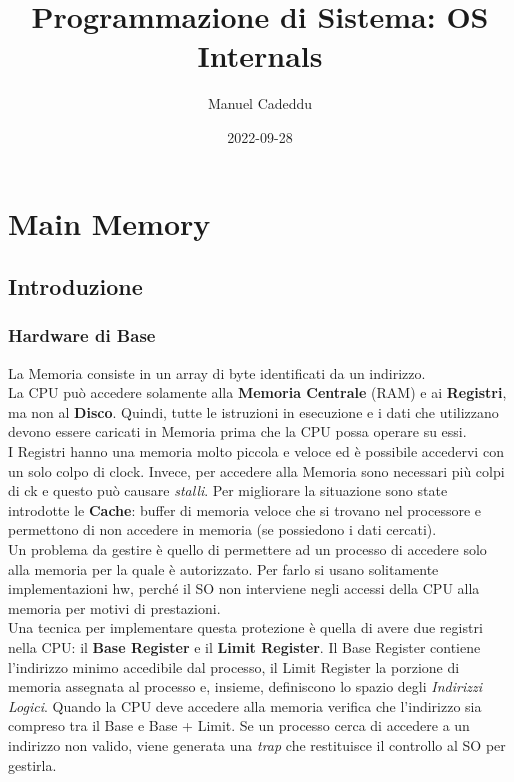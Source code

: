 \documentclass{article}
\title{Programmazione di Sistema: OS Internals}
\date{2022-09-28}
\author{Manuel Cadeddu}
\begin{document}
	\maketitle
	\newpage
	\doublespacing
	\tableofcontents
	\singlespacing
	\newpage
	
	\section{Main Memory}

		\subsection{Introduzione}

			\subsubsection{Hardware di Base}
				La Memoria consiste in un array di byte identificati da un indirizzo. 
				\\La CPU può accedere solamente alla \textbf{Memoria Centrale} (RAM) e ai \textbf{Registri}, ma non al \textbf{Disco}. Quindi, tutte le istruzioni in esecuzione e i dati che utilizzano devono essere caricati in Memoria prima che la CPU possa operare su essi.
				\\I Registri hanno una memoria molto piccola e veloce ed è possibile accedervi con un solo colpo di clock. Invece, per accedere alla Memoria sono necessari più colpi di ck e questo può causare \textit{stalli}. Per migliorare la situazione sono state introdotte le \textbf{Cache}: buffer di memoria veloce che si trovano nel processore e permettono di non accedere in memoria (se possiedono i dati cercati).
				\\Un problema da gestire è quello di permettere ad un processo di accedere solo alla memoria per la quale è autorizzato. Per farlo si usano solitamente implementazioni hw, perché il SO non interviene negli accessi della CPU alla memoria per motivi di prestazioni.
				\\Una tecnica per implementare questa protezione è quella di avere due registri nella CPU: il \textbf{Base Register} e il \textbf{Limit Register}. Il Base Register contiene l'indirizzo minimo accedibile dal processo, il Limit Register la porzione di memoria assegnata al processo e, insieme, definiscono lo spazio degli \textit{Indirizzi Logici}. Quando la CPU deve accedere alla memoria verifica che l'indirizzo sia compreso tra il Base e Base + Limit. Se un processo cerca di accedere a un indirizzo non valido, viene generata una \textit{trap} che restituisce il controllo al SO per gestirla.
\end{document}
